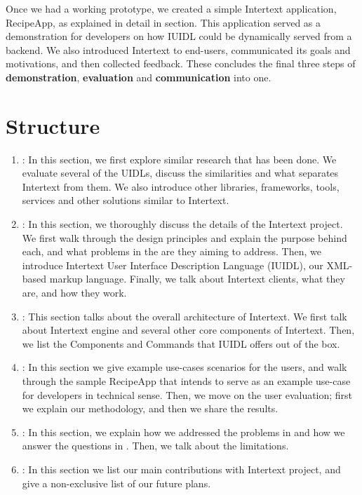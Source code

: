 Once we had a working prototype, we created a simple Intertext application, RecipeApp, as explained in detail in  section. This application served as a demonstration for developers on how IUIDL could be dynamically served from a backend. We also introduced Intertext to end-users, communicated its goals and motivations, and then collected feedback. These concludes the final three steps of \textbf{demonstration}, \textbf{evaluation} and \textbf{communication} into one.

\section{Structure} \label{structure}

\begin{enumerate}
    
    \item \textbf{}: In this section, we first explore similar research that has been done. We evaluate several of the UIDLs, discuss the similarities and what separates Intertext from them. We also introduce other libraries, frameworks, tools, services and other solutions similar to Intertext.

    \item \textbf{}: In this section, we thoroughly discuss the details of the Intertext project. We first walk through the design principles and explain the purpose behind each, and what problems in the  are they aiming to address. Then, we introduce Intertext User Interface Description Language (IUIDL), our XML-based markup language. Finally, we talk about Intertext clients, what they are, and how they work.

    \item \textbf{}: This section talks about the overall architecture of Intertext. We first talk about Intertext engine and several other core components of Intertext. Then, we list the Components and Commands that IUIDL offers out of the box.
    
    \item \textbf{}: In this section we give example use-cases scenarios for the users, and walk through the sample RecipeApp that intends to serve as an example use-case for developers in technical sense. Then, we move on the user evaluation; first we explain our methodology, and then we share the results.

    \item \textbf{}: In this section, we explain how we addressed the problems in  and how we answer the questions in . Then, we talk about the limitations.

    \item \textbf{}: In this section we list our main contributions with Intertext project, and give a non-exclusive list of our future plans.
    
\end{enumerate}